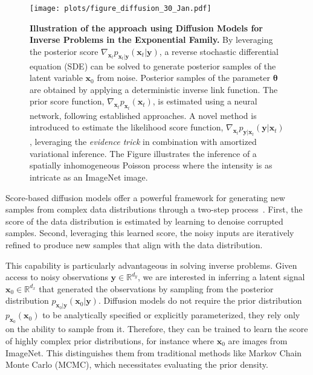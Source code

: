 

\begin{figure*}[ht!]
\centering
\texttt{[image: plots/figure\_diffusion\_30\_Jan.pdf]}
\caption{\textbf{Illustration of the approach using Diffusion Models for Inverse Problems in the Exponential Family.} By leveraging the posterior score $\nabla_{\mathbf{x}_t} p_{\mathbf{x}_t|\mathbf{y}}(\mathbf{x}_t|\mathbf{y})$, a reverse stochastic differential equation (SDE) can be solved to generate posterior samples of the latent variable $\mathbf{x}_0$ from noise. Posterior samples of the parameter $\boldsymbol{\theta}$ are obtained by applying a deterministic inverse link function. The prior score function, $\nabla_{\mathbf{x}_t} p_{\mathbf{x}_t}(\mathbf{x}_t)$, is estimated using a neural network, following established approaches. A novel method is introduced to estimate the likelihood score function, $\nabla_{\mathbf{x}_t} p_{\mathbf{y}|\mathbf{x}_t}(\mathbf{y}|\mathbf{x}_t)$, leveraging the \textit{evidence trick} in combination with amortized variational inference.  The Figure illustrates the inference of a spatially inhomogeneous Poisson process where the intensity is as intricate as an ImageNet image.}
\label{fig-intro-summary-figure}
\end{figure*}


Score-based diffusion models offer a powerful framework for generating new samples from complex data distributions through a two-step process~\citep{song2021scorebased}. First, the score of the data distribution is estimated by learning to denoise corrupted samples. Second, leveraging this learned score, the noisy inputs are iteratively refined to produce new samples that align with the data distribution.


This capability is particularly advantageous in solving inverse problems. Given access to noisy observations $\mathbf{y} \in \mathbb{R}^{d_y}$, we are interested in inferring a latent signal $\mathbf{x}_0 \in \mathbb{R}^{d_x}$ that generated the observations by sampling from the posterior distribution $p_{\mathbf{x}_0|\mathbf{y}}(\mathbf{x}_0|\mathbf{y})$.
Diffusion models do not require the prior distribution $p_{\mathbf{x}_0}(\mathbf{x}_0)$ to be analytically specified or explicitly parameterized, they rely only on the ability to sample from it.
Therefore, they can be trained to learn the score of highly complex prior distributions, for instance where $\mathbf{x}_0$ are images from ImageNet. 
This distinguishes them from traditional methods like Markov Chain Monte Carlo (MCMC), which necessitates evaluating the prior density.


